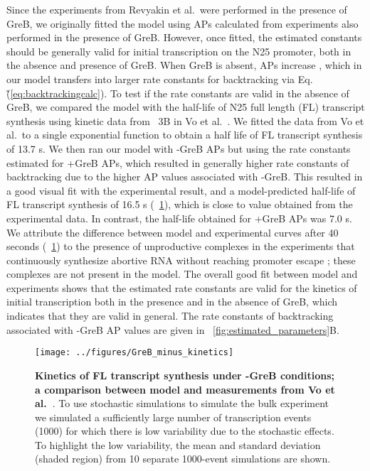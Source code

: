 Since the experiments from Revyakin et al.\ were performed in the presence of
GreB, we originally fitted the model using APs calculated from experiments
also performed in the presence of GreB. However, once fitted, the estimated
constants should be generally valid for initial transcription on the N25
promoter, both in the absence and presence of GreB. When GreB is absent, APs
increase \cite{hsu_initial_2006}, which in our model transfers into larger
rate constants for backtracking via Eq.\~(\ref{eq:backtrackingcalc}). To test
if the rate constants are valid in the absence of GreB, we compared the model
with the half-life of N25 full length (FL) transcript synthesis using kinetic
data from \FIG~3B in Vo et al.\ \cite{vo_vitro_2003-1}.  We fitted the data
from Vo et al.\ to a single exponential function to obtain a half life of FL
transcript synthesis of 13.7 s. We then ran our model with -GreB APs but using
the rate constants estimated for +GreB APs, which resulted in generally
higher rate constants of backtracking due to the higher AP values associated
with -GreB. This resulted in a good visual fit with the experimental result,
and a model-predicted half-life of FL transcript synthesis of 16.5 s
(\FIG~\ref{fig:vo_comparison}), which is close to value obtained from the
experimental data. In contrast, the half-life obtained for +GreB APs was 7.0
s. We attribute the difference between model and experimental curves after 40
seconds (\FIG~\ref{fig:vo_comparison}) to the presence of unproductive
complexes in the experiments that continuously synthesize abortive RNA without
reaching promoter escape \cite{vo_vitro_2003-1}; these complexes are not
present in the model. The overall good fit between model and experiments shows
that the estimated rate constants are valid for the kinetics of initial
transcription both in the presence and in the absence of GreB, which indicates
that they are valid in general. The rate constants of backtracking associated
with -GreB AP values are given in \FIG~\ref{fig:estimated_parameters}B.

\begin{figure}[h]
    \begin{center}
        \texttt{[image: ../figures/GreB\_minus\_kinetics]}
    \end{center}
    \caption{ {\bf Kinetics of FL transcript synthesis under -GreB conditions;
        a comparison between model and measurements from Vo
      et al.~\cite{vo_vitro_2003-1}}. To use stochastic simulations to
      simulate the bulk experiment we simulated a sufficiently large number of
      transcription events (1000) for which there is low variability due to
      the stochastic effects. To highlight the low variability, the mean and
      standard deviation (shaded region) from 10 separate 1000-event
      simulations are shown.}
\label{fig:vo_comparison}
\end{figure}

